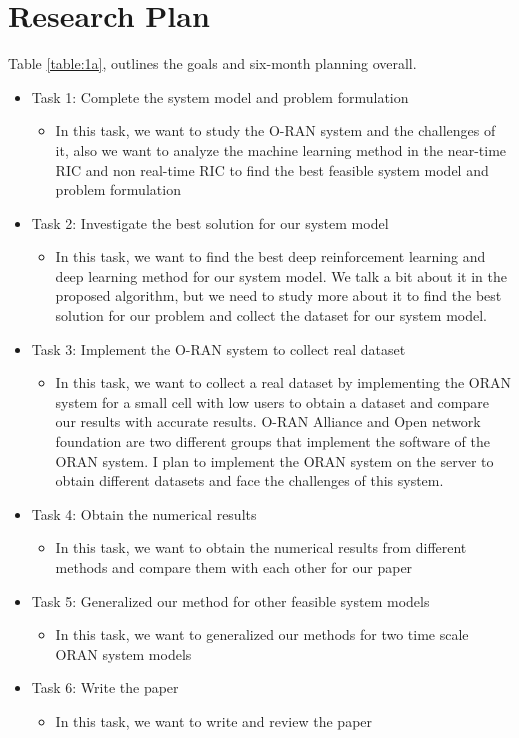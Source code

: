 \documentclass{article}
\begin{document}
\section{Research Plan}
Table \ref{table:1a}, outlines the goals and six-month planning overall.
\begin{itemize}
\item Task 1: Complete the system model and problem formulation
\begin{itemize}
\color{darkgray}
\item In this task, we want to study the O-RAN system and the challenges of it, also we want to analyze the machine learning method in the near-time RIC and non real-time RIC to find the best feasible system model and problem formulation
\end{itemize}
\item Task 2: Investigate the best solution for our system model
\begin{itemize}
\color{darkgray}
\item In this task, we want to find the best deep reinforcement learning and deep learning method for our system model. We talk a bit about it in the proposed algorithm, but we need to study more about it to find the best solution for our problem and collect the dataset for our system model.
\end{itemize}
\item Task 3: Implement the O-RAN system to collect real dataset 
\begin{itemize}
\color{darkgray}
\item In this task, we want to collect a real dataset by implementing the ORAN system for a small cell with low users to obtain a dataset and compare our results with accurate results. O-RAN Alliance and Open network foundation are two different groups that implement the software of the ORAN system. I plan to implement the ORAN system on the server to obtain different datasets and face the challenges of this system. 
\end{itemize}
\item Task 4: Obtain the numerical results
\begin{itemize}
\color{darkgray}
\item In this task, we want to obtain the numerical results from different methods and compare them with each other for our paper
\end{itemize}
\item Task 5: Generalized our method for other feasible system models
\begin{itemize}
\color{darkgray}
\item In this task, we want to generalized our methods for two time scale  ORAN system models  
\end{itemize}
\item Task 6: Write the paper
\begin{itemize}
\color{darkgray}
\item In this task, we want to write and review the paper
\end{itemize}
\end{itemize}
\end{document}
